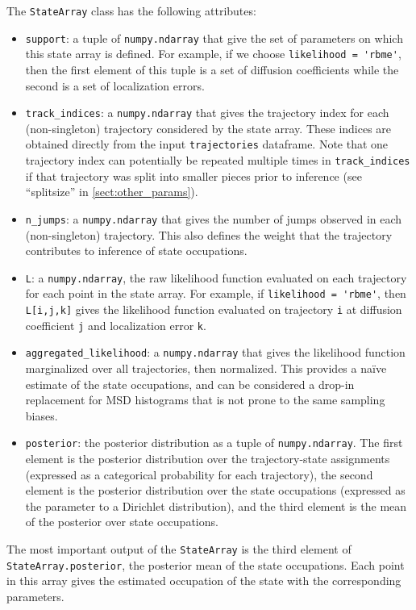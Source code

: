 \documentclass{article}
\begin{document}
The \verb|StateArray| class has the following attributes:
\begin{itemize}
    \item \verb|support|: a tuple of \verb|numpy.ndarray| that give the set of parameters on which this state array is defined. For example, if we choose \verb|likelihood = 'rbme'|, then the first element of this tuple is a set of diffusion coefficients while the second is a set of localization errors. 
    \item \verb|track_indices|: a \verb|numpy.ndarray| that gives the trajectory index for each (non-singleton) trajectory considered by the state array. These indices are obtained directly from the input \verb|trajectories| dataframe. Note that one trajectory index can potentially be repeated multiple times in \verb|track_indices| if that trajectory was split into smaller pieces prior to inference (see ``splitsize'' in \ref{sect:other_params}). 
    \item \verb|n_jumps|: a \verb|numpy.ndarray| that gives the number of jumps observed in each (non-singleton) trajectory. This also defines the weight that the trajectory contributes to inference of state occupations.
    \item \verb|L|: a \verb|numpy.ndarray|, the raw likelihood function evaluated on each trajectory for each point in the state array. For example, if \verb|likelihood = 'rbme'|, then \verb|L[i,j,k]| gives the likelihood function evaluated on trajectory \verb|i| at diffusion coefficient \verb|j| and localization error \verb|k|. 
    \item \verb|aggregated_likelihood|: a \verb|numpy.ndarray| that gives the likelihood function marginalized over all trajectories, then normalized. This provides a na{\"i}ve estimate of the state occupations, and can be considered a drop-in replacement for MSD histograms that is not prone to the same sampling biases. 
    \item \verb|posterior|: the posterior distribution as a tuple of \verb|numpy.ndarray|. The first element is the posterior distribution over the trajectory-state assignments (expressed as a categorical probability for each trajectory), the second element is the posterior distribution over the state occupations (expressed as the parameter to a Dirichlet distribution), and the third element is the mean of the posterior over state occupations.
\end{itemize}

The most important output of the \verb|StateArray| is the third element of 
\verb|StateArray.posterior|, the posterior mean of the state occupations. 
Each point in this array gives the estimated occupation of the state with the
corresponding parameters.
\end{document}
